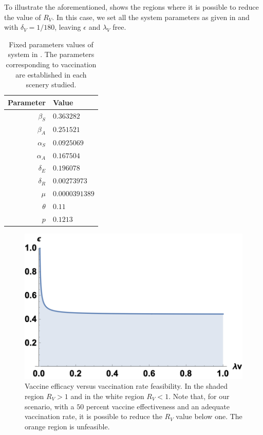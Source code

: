 To illustrate the aforementioned,  shows the regions where it is possible to
reduce the value of $ R_V $. In this case, we set all the system parameters as given in
 and with $ \delta_V = 1/180 $, leaving $ \epsilon $ and $
\lambda_V $ free.
\begin{table}[h!]
    \begin{center}
        \begin{tabular}{rl}
            \toprule
            Parameter & Value
            \\
            \midrule
            $\beta_S$ & $ \num{0.363282}$
            \\
            $\beta_A$ & $\num{0.251521}$
            \\
            $\alpha_{S}$  & $\num{0.0925069}$
            \\
            $\alpha_{A}$ & $\num{0.167504}$
            \\
            $\delta_{E}$ & $\num{0.196078}$
            \\
            $\delta_{R}$ & $\num{0.00273973}$
            \\
            $\mu$        & $\num{0.0000391389} $
            \\
            $\theta$        & $\num{0.11}$
            \\
            $p$        & $\num{0.1213} $
            \\
            \bottomrule
        \end{tabular}
        \caption{%
            Fixed parameters values of system in .
            The parameters corresponding to vaccination are
            established in each scenery studied.}
        \label{tbl:fixed_parameters}
    \end{center}
\end{table}
%
\begin{figure}[tbh]
    \centering
    \includegraphics[scale=0.6]{R0-2D.png}
    \caption{
        Vaccine efficacy versus vaccination rate feasibility.
        In the shaded region $R_V>1 $ and in the white region $ R_V <1 $.
        Note that, for our scenario, with a $50$ percent vaccine effectiveness
        and an adequate vaccination rate, it is possible to reduce the $ R_V $
        value below one. The orange region is unfeasible.}
    \label{R0-2D}
\end{figure}

